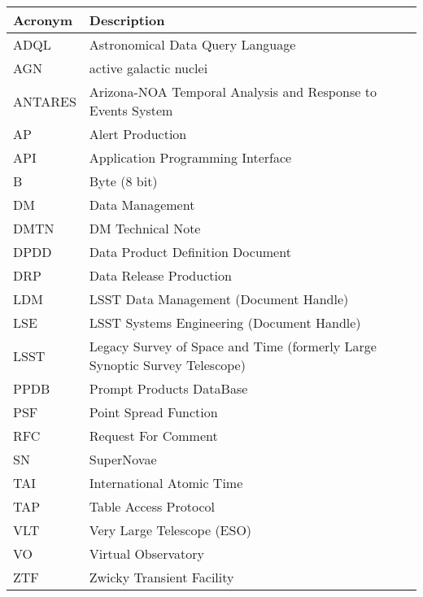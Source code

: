 \addtocounter{table}{-1}
\begin{longtable}{p{}p{}}\hline
\textbf{Acronym} & \textbf{Description}  \\\hline

ADQL & Astronomical Data Query Language \\\hline
AGN & active galactic nuclei \\\hline
ANTARES & Arizona-NOA Temporal Analysis and Response to Events System \\\hline
AP & Alert Production \\\hline
API & Application Programming Interface \\\hline
B & Byte (8 bit) \\\hline
DM & Data Management \\\hline
DMTN & DM Technical Note \\\hline
DPDD & Data Product Definition Document \\\hline
DRP & Data Release Production \\\hline
LDM & LSST Data Management (Document Handle) \\\hline
LSE & LSST Systems Engineering (Document Handle) \\\hline
LSST & Legacy Survey of Space and Time (formerly Large Synoptic Survey Telescope) \\\hline
PPDB & Prompt Products DataBase \\\hline
PSF & Point Spread Function \\\hline
RFC & Request For Comment \\\hline
SN & SuperNovae \\\hline
TAI & International Atomic Time \\\hline
TAP & Table Access Protocol \\\hline
VLT & Very Large Telescope (ESO) \\\hline
VO & Virtual Observatory \\\hline
ZTF & Zwicky Transient Facility \\\hline
\end{longtable}
